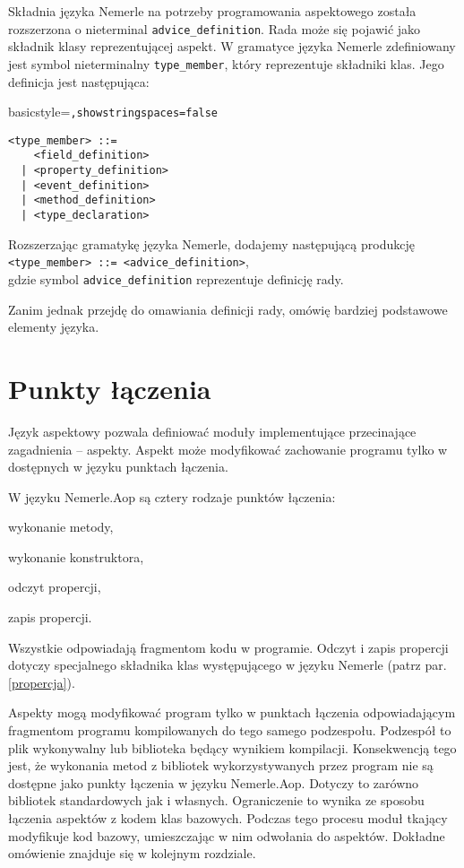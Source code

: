 \documentclass[a4paper,12pt]{mwbk}
\begin{document}
Składnia języka Nemerle na potrzeby programowania aspektowego została
rozszerzona o nieterminal \lstinline!advice_definition!. Rada może się pojawić
jako składnik klasy reprezentującej aspekt. W gramatyce języka Nemerle
\cite{nemerle} zdefiniowany jest symbol nieterminalny \lstinline!type_member!,
który reprezentuje składniki klas. Jego definicja jest następująca:

 {basicstyle=\tt,showstringspaces=false}
\begin{lstlisting}[style=grammar]
<type_member> ::=
    <field_definition>
  | <property_definition>
  | <event_definition>
  | <method_definition>
  | <type_declaration> 
\end{lstlisting}

Rozszerzając gramatykę języka Nemerle, dodajemy następującą produkcję\\
\lstinline!<type_member> ::= <advice_definition>!,\\ gdzie symbol
\lstinline!advice_definition! reprezentuje definicję rady.

Zanim jednak przejdę do omawiania definicji rady, omówię
bardziej podstawowe elementy języka.

\section{Punkty łączenia}

Język aspektowy pozwala definiować moduły implementujące przecinające
zagadnienia -- aspekty. Aspekt może modyfikować zachowanie programu tylko w
dostępnych w języku punktach łączenia.

W języku Nemerle.Aop są cztery rodzaje punktów łączenia:
\begin{itemize*}
    \item wykonanie metody,
    \item wykonanie konstruktora,
    \item odczyt propercji,
    \item zapis propercji.
\end{itemize*}
Wszystkie odpowiadają fragmentom kodu w programie. Odczyt i zapis propercji
dotyczy specjalnego składnika klas występującego w języku Nemerle (patrz par. \ref{propercja}). 

Aspekty mogą modyfikować program tylko w punktach łączenia odpowiadającym
fragmentom programu kompilowanych do tego samego podzespołu. Podzespół to plik
wykonywalny lub biblioteka będący wynikiem kompilacji. Konsekwencją tego jest,
że wykonania metod z bibliotek wykorzystywanych przez program nie są dostępne
jako punkty łączenia w języku Nemerle.Aop. Dotyczy to zarówno bibliotek
standardowych jak i własnych. Ograniczenie to wynika ze sposobu łączenia
aspektów z kodem klas bazowych. Podczas tego procesu moduł tkający modyfikuje
kod bazowy, umieszczając w nim odwołania do aspektów. Dokładne omówienie
znajduje się w kolejnym rozdziale.
\end{document}
